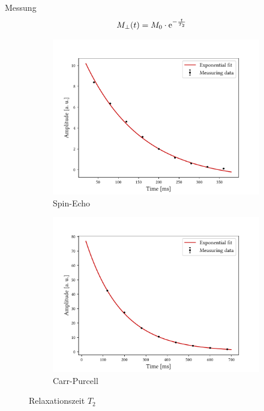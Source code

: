 \begin{frame}{Messung}
	\begin{align*}
	M_\bot(t)&=M_0\cdot\mathrm{e}^{-\frac{t}{T_2}}
	\end{align*}
	\begin{figure}
	\centering
		\begin{subfigure}{.49\textwidth}
		\centering
		\includegraphics[scale=.36]{..//figures//f61_abb_2.pdf}
		\caption{Spin-Echo}
		\end{subfigure}
		\begin{subfigure}{.49\textwidth}
		\centering
		\includegraphics[scale=.36]{..//figures//f61_abb_3.pdf}
		\caption{Carr-Purcell}
		\end{subfigure}
	\caption{Relaxationszeit $T_2$}
	\end{figure}
\end{frame}

